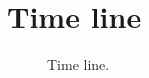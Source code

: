 \documentclass[letterpaper,oneside,12pt]{article}
\begin{document}
\section{Time line}

\begin{figure}[ht]
 \centerline{}
 \caption{Time line.}
 \label{fig:timeline}
\end{figure}

\end{document}
